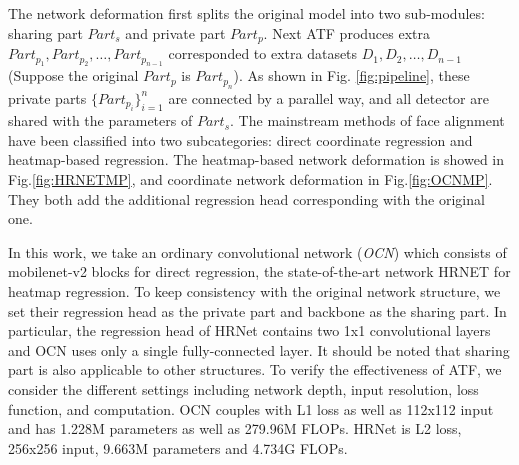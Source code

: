 \documentclass[journal,transmag]{IEEEtran}
\begin{document}
The network deformation first splits the original model into two sub-modules: sharing part $Part_s$ and private part $Part_p$.
Next ATF produces extra $Part_{p_1},Part_{p_2},\dots,Part_{p_{n-1}}$ corresponded to extra datasets $D_1, D_2, \dots, D_{n-1}$ (Suppose the original $Part_p$ is $Part_{p_n}$).
As shown in Fig. \ref{fig:pipeline}, these private parts $\{ Part_{p_i} \}_{i=1}^n$ are connected by a parallel way, and all detector are shared with the parameters of $Part_s$.
The mainstream methods of face alignment have been classified into two subcategories: direct coordinate regression and heatmap-based regression.
The heatmap-based network deformation is showed in Fig.\ref{fig:HRNETMP}, and coordinate network deformation in Fig.\ref{fig:OCNMP}. 
They both add the additional regression head corresponding with the original one.

In this work, we take an ordinary convolutional network (\emph{OCN}) which consists of mobilenet-v2 \cite{sandler2018mobilenetv2} blocks for direct regression, the state-of-the-art network HRNET \cite{HRNET} for heatmap regression.
To keep consistency with the original network structure, we set their regression head as the private part and backbone as the sharing part.
In particular, the regression head of HRNet contains two 1x1 convolutional layers and OCN uses only a single fully-connected layer.
It should be noted that sharing part is also applicable to other structures.
To verify the effectiveness of ATF, we consider the different settings including network depth, input resolution, loss function, and computation.
OCN couples with L1 loss as well as 112x112 input and has 1.228M parameters as well as 279.96M FLOPs.
HRNet is L2 loss, 256x256 input, 9.663M parameters and 4.734G FLOPs.


\end{document}
